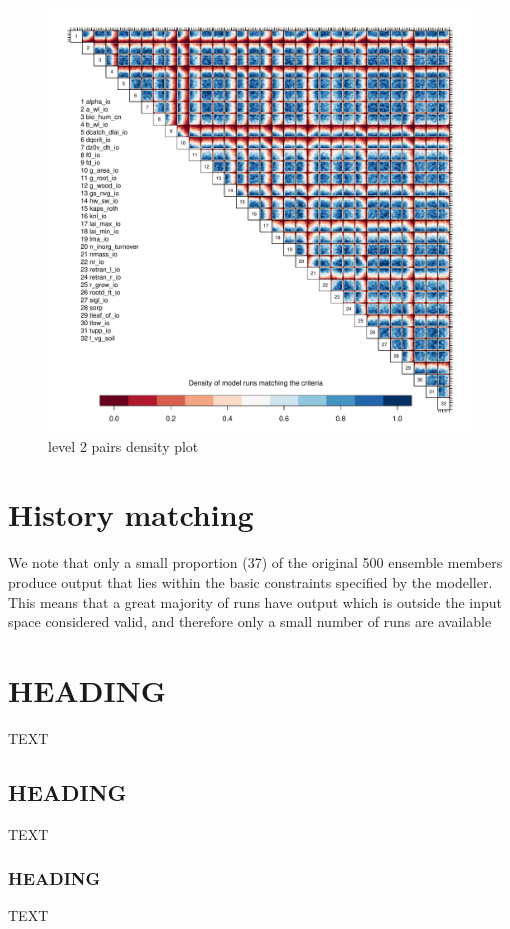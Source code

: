 \documentclass[gmd, manuscript]{copernicus}
\begin{document}
\begin{figure}[t]
\includegraphics[width=12cm]{./graphics/pairs_dens_level2_km.pdf}
\caption{level 2 pairs density plot}
\label{fig:pairs_dens_level2_km}
\end{figure}


\section{History matching}
We note that only a small proportion (37) of the original 500 ensemble members produce output that lies within the basic constraints specified by the modeller. This means that a great majority of runs have output which is outside the input space considered valid, and therefore only a small number of runs are available 





\section{HEADING}
TEXT


\subsection{HEADING}
TEXT


\subsubsection{HEADING}
TEXT
\end{document}
